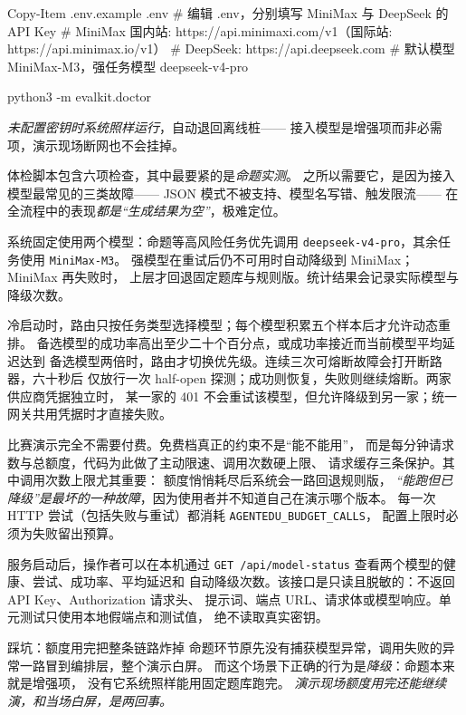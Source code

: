 \begin{code}
Copy-Item .env.example .env
# 编辑 .env，分别填写 MiniMax 与 DeepSeek 的 API Key
# MiniMax 国内站: https://api.minimaxi.com/v1（国际站: https://api.minimax.io/v1）
# DeepSeek: https://api.deepseek.com
# 默认模型 MiniMax-M3，强任务模型 deepseek-v4-pro

python3 -m evalkit.doctor
\end{code}

\emph{未配置密钥时系统照样运行}，自动退回离线桩——
接入模型是增强项而非必需项，演示现场断网也不会挂掉。

体检脚本包含六项检查，其中最要紧的是\emph{命题实测}。
之所以需要它，是因为接入模型最常见的三类故障——
JSON 模式不被支持、模型名写错、触发限流——
在全流程中的表现\emph{都是“生成结果为空”}，极难定位。

系统固定使用两个模型：命题等高风险任务优先调用
\texttt{deepseek-v4-pro}，其余任务使用 \texttt{MiniMax-M3}。
强模型在重试后仍不可用时自动降级到 MiniMax；MiniMax 再失败时，
上层才回退固定题库与规则版。统计结果会记录实际模型与降级次数。

冷启动时，路由只按任务类型选择模型；每个模型积累五个样本后才允许动态重排。
备选模型的成功率高出至少二十个百分点，或成功率接近而当前模型平均延迟达到
备选模型两倍时，路由才切换优先级。连续三次可熔断故障会打开断路器，六十秒后
仅放行一次 half-open 探测；成功则恢复，失败则继续熔断。两家供应商凭据独立时，
某一家的 401 不会重试该模型，但允许降级到另一家；统一网关共用凭据时才直接失败。

比赛演示完全不需要付费。免费档真正的约束不是“能不能用”，
而是每分钟请求数与总额度，代码为此做了主动限速、调用次数硬上限、
请求缓存三条保护。其中调用次数上限尤其重要：
额度悄悄耗尽后系统会一路回退规则版，
\emph{“能跑但已降级”是最坏的一种故障}，因为使用者并不知道自己在演示哪个版本。
每一次 HTTP 尝试（包括失败与重试）都消耗 \texttt{AGENTEDU\_BUDGET\_CALLS}，
配置上限时必须为失败留出预算。

服务启动后，操作者可以在本机通过
\texttt{GET /api/model-status} 查看两个模型的健康、尝试、成功率、平均延迟和
自动降级次数。该接口是只读且脱敏的：不返回 API Key、Authorization 请求头、
提示词、端点 URL、请求体或模型响应。单元测试只使用本地假端点和测试值，
绝不读取真实密钥。

\begin{keynote}{踩坑：额度用完把整条链路炸掉}
命题环节原先没有捕获模型异常，调用失败的异常一路冒到编排层，整个演示白屏。
而这个场景下正确的行为是\emph{降级}：命题本来就是增强项，
没有它系统照样能用固定题库跑完。
\emph{演示现场额度用完还能继续演，和当场白屏，是两回事。}
\end{keynote}

